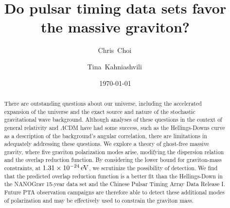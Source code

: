 \documentclass[prd,twocolumn,aps,psfig,nofootinbib,nobibnotes,superscriptaddress,preprintnumbers,times]{revtex4-2}
\newcommand{\eV}{\,{\rm eV}}
\begin{document}
\title{Do pulsar timing data sets favor the massive graviton?}

\date{\today}
\author{Chris~Choi\,}

\author{Tina~Kahniashvili\,}

\begin{abstract}
There are outstanding questions about our universe, including the accelerated expansion of the universe and the exact source and nature of the stochastic gravitational wave background. Although analyses of these questions in the context of general relativity and $\Lambda$CDM have had some success, such as the Hellings-Downs curve as a description of the background's angular correlation, there are limitations in adequately addressing these questions. We explore a theory of ghost-free massive gravity, where five graviton polarization modes arise, modifying the dispersion relation and the overlap reduction function. By considering the lower bound for graviton-mass constraints, at $1.31 \times 10^{-24} \eV$, we scrutinize the possibility of detection. We find that the predicted overlap reduction function is a better fit than the Hellings-Down in the NANOGrav 15-year data set and the Chinese Pulsar Timing Array Data Release I. Future PTA observation campaigns are therefore able to detect these additional modes of polarization and may be effectively used to constrain the graviton mass.

\end{abstract}

\maketitle
\end{document}
